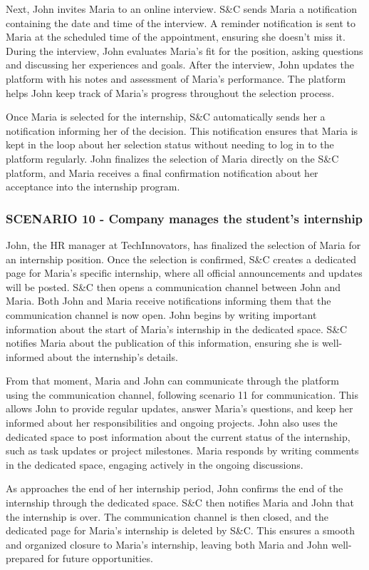 Next, John invites Maria to an online interview. S\&C sends Maria a notification containing the
date and time of the interview. A reminder notification is sent to Maria at the scheduled time
of the appointment, ensuring she doesn’t miss it. During the interview, John evaluates Maria’s fit
for the position, asking questions and discussing her experiences and goals. After the interview,
John updates the platform with his notes and assessment of Maria’s performance. The platform helps
John keep track of Maria’s progress throughout the selection process.

Once Maria is selected for the internship, S\&C automatically sends her a notification informing her
of the decision. This notification ensures that Maria is kept in the loop about her selection status
without needing to log in to the platform regularly. John finalizes the selection of Maria directly
on the S\&C platform, and Maria receives a final confirmation notification about her acceptance into
the internship program.
\subsubsection{SCENARIO 10 - Company manages the student's internship}
John, the HR manager at TechInnovators, has finalized the selection of Maria for an internship position.
Once the selection is confirmed, S\&C creates a dedicated page for Maria’s specific internship, where
all official announcements and updates will be posted. S\&C then opens a communication channel between
John and Maria. Both John and Maria receive notifications informing them that the communication channel
is now open. John begins by writing important information about the start of Maria’s internship in the
dedicated space. S\&C notifies Maria about the publication of this information, ensuring she is
well-informed about the internship’s details.

From that moment, Maria and John can communicate through the platform using the communication channel,
following scenario 11 for communication. This allows John to provide regular updates,
answer Maria’s questions, and keep her informed about her responsibilities and ongoing projects.
John also uses the dedicated space to post information about the current status of the internship,
such as task updates or project milestones. Maria responds by writing comments in the dedicated space,
engaging actively in the ongoing discussions.

As approaches the end of her internship period, John confirms the end of the internship through
the dedicated space. S\&C then notifies Maria and John that the internship is over. The communication
channel is then closed, and the dedicated page for Maria’s internship is deleted by S\&C. This ensures a smooth and organized closure
to Maria’s internship, leaving both Maria and John well-prepared for future opportunities.
